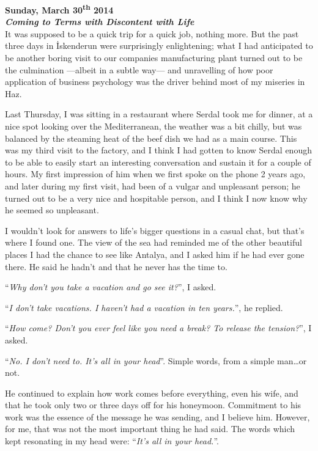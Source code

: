 \documentclass[b5paper]{book}
\begin{document}
\setlength{\parskip}{1em}
\noindent\textbf{%
	Sunday, March 30\textsuperscript{th} 2014\\
	\emph{Coming to Terms with Discontent with Life}
}\\

It was supposed to be a quick trip for a quick job, nothing more. But the past three days in İskenderun were surprisingly enlightening; what I had anticipated to be another boring visit to our companies manufacturing plant turned out to be the culmination ---albeit in a subtle way--- and unravelling of how poor application of business psychology was the driver behind most of my miseries in Haz.

Last Thursday, I was sitting in a restaurant where Serdal took me for dinner, at a nice spot looking over the Mediterranean, the weather was a bit chilly, but was balanced by the steaming heat of the beef dish we had as a main course. This was my third visit to the factory, and I think I had gotten to know Serdal enough to be able to easily start an interesting conversation and sustain it for a couple of hours. My first impression of him when we first spoke on the phone 2 years ago, and later during my first visit, had been of a vulgar and unpleasant person; he turned out to be a very nice and hospitable person, and I think I now know why he seemed so unpleasant.

I wouldn't look for answers to life's bigger questions in a casual chat, but that's where I found one. The view of the sea had reminded me of the other beautiful places I had the chance to see like Antalya, and I asked him if he had ever gone there. He said he hadn't and that he never has the time to.

``\emph{Why don't you take a vacation and go see it?}'', I asked.

``\emph{I don't take vacations. I haven't had a vacation in ten years.}'', he replied.

``\emph{How come? Don't you ever feel like you need a break? To release the tension?}'', I asked.

``\emph{No. I don't need to. It's all in your head}''. Simple words, from a simple man\ldots or not.

He continued to explain how work comes before everything, even his wife, and that he took only two or three days off for his honeymoon. Commitment to his work was the essence of the message he was sending, and I believe him. However, for me, that was not the most important thing he had said. The words which kept resonating in my head were: ``\emph{It's all in your head.}''.
\end{document}
